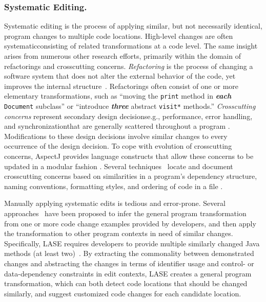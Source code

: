\documentclass[runningheads,a4paper]{llncs}
\newcommand{\codefont}[1]{\footnotesize{\texttt{#1}}\normalsize}
\begin{document}
\subsubsection{Systematic Editing.} 
Systematic editing is the process of applying similar, but not necessarily identical, program changes to multiple code locations. 
High-level changes are often systematic\textemdash consisting of related transformations at a code level. The same insight arises from numerous other research efforts, primarily within the domain of refactorings and crosscutting concerns. {\em Refactoring} is the process of changing a software system that does not alter the external behavior of the code, yet improves the internal structure~\cite{Fowler2000, Griswold1991, Mens2004, Opdyke1992}. Refactorings often consist of one or more elementary transformations, such as ``moving the \codefont{print} method in {\bf \em each} \codefont{Document} subclass'' or ``introduce {\bf \em three} abstract \codefont{visit*} methods.'' {\em Crosscutting concerns} represent secondary design decisions\textemdash e.g., performance, error handling, and synchronization\textemdash that are generally scattered throughout a program \cite{Kiczales1997, Tarr1999}. Modifications to these design decisions involve similar changes to every occurrence of the design decision. To cope with evolution of crosscutting concerns, AspectJ provides language constructs that allow these concerns to be updated in a modular fashion \cite{Kiczales2001}. Several techniques~\cite{Breu2006, Dagenais2007} locate and document crosscutting concerns based on similarities in a program's dependency structure, naming conventions, formatting styles, and ordering of code in a file \cite{Griswold2001}. 

Manually applying systematic edits is tedious and error-prone. 
Several approaches~\cite{MKM2011,MKM2013,Rolim:2017} have been proposed to infer the general program transformation from one or more code change examples provided by developers, and then apply the transformation to other program contexts in need of similar changes. Specifically, LASE requires developers to provide multiple similarly changed Java methods (at least two)~\cite{MKM2013}. By extracting the commonality between demonstrated changes and abstracting the changes in terms of identifier usage and control- or data-dependency constraints in edit contexts, LASE creates a general program transformation, which can both detect code locations that should be changed similarly, and suggest customized code changes for each candidate location.
\end{document}
